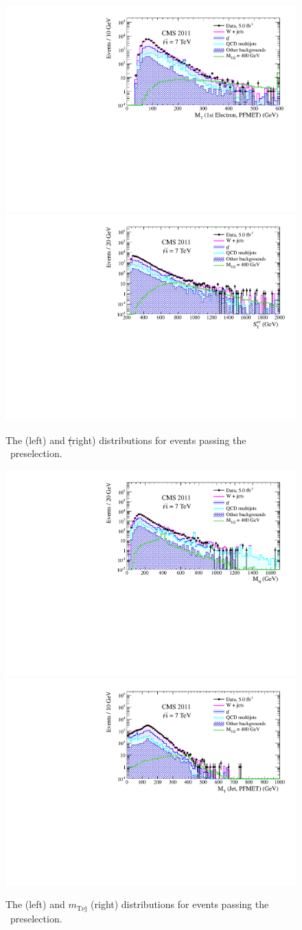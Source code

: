 \begin{figure}[htbp]
  \begin{center}
    {\includegraphics[width=.45\textwidth]{tex/analysis/event_selection/fig/enu/preselection/MTenu_PAS_enujj_WZSherpa_noNSigma.pdf}}
    {\includegraphics[width=.45\textwidth]{tex/analysis/event_selection/fig/enu/preselection/sT_PAS_enujj_WZSherpa_noNSigma.pdf}}
    \caption{
      The \mt (left) and \st (right) distributions for events passing the \enujj~preselection.
    }
    \label{fig:enujj_preselection_mt_and_st}
  \end{center}
\end{figure}

\begin{figure}[htbp]
  \begin{center}
    {\includegraphics[width=.45\textwidth]{tex/analysis/event_selection/fig/enu/preselection/Mej_PAS_enujj_WZSherpa_noNSigma.pdf}}
    {\includegraphics[width=.45\textwidth]{tex/analysis/event_selection/fig/enu/preselection/MTjnu_PAS_enujj_WZSherpa_noNSigma.pdf}}
    \caption{
      The \mej (left) and $m_{\text{T}\nu\text{j}}$ (right) distributions 
      for events passing the \enujj~preselection.
    }
    \label{fig:enujj_preselection_mej_and_mt}
  \end{center}
\end{figure}



